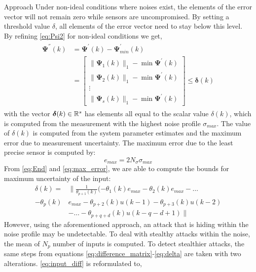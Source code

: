 \begin{section}{Approach}
Under non-ideal conditions where noises exist, the elements of the error vector will not remain zero while sensors are uncompromised. By setting a threshold value $\delta$, all elements of the error vector need to stay below this level. By refining \eqref{eq:Psi2} for non-ideal conditions we get,
    \begin{align}
    \begin{split}
    \label{eq:Psi2_nonideal}
	\bm{\Psi^{''}}(k)&=\bm{\Psi^{'}}(k)-\bm{\Psi}^{'}_{min}(k) \\
	& =\begin{bmatrix} \lVert{\bm{\Psi}_1(k)}\rVert_1 - \min \bm{\Psi}^{'}(k)\\ \lVert{\bm{\Psi}_2(k)}\rVert_1 - \min \bm{\Psi}^{'}(k) \\ \vdots \\ \lVert{\bm{\Psi}_s(k)}\rVert_1 - \min \bm{\Psi}^{'}(k) \end{bmatrix} \leq \bm{\delta}(k)
	\end{split}
	\end{align}
with the vector $\bm{\delta}(k) \in \mathbb{R}^s$ has elements all equal to the scalar value $\delta(k)$, which is computed from the measurement with the highest noise profile $\sigma_{max}$. The value of $\delta(k)$ is computed from the system parameter estimates and the maximum error due to measurement uncertainty. The maximum error due to the least precise sensor is computed by:
	\begin{equation}
	    \label{eq:max_error}
	    e_{max} = 2N_{\sigma}\sigma_{max}
	\end{equation}
From \eqref{eq:End} and \eqref{eq:max_error}, we are able to compute the bounds for maximum uncertainty of the input:
\begin{align}
	\label{eq:delta}
	\delta(k)=& \lVert{ \frac{1}{\theta_{p+1}(k)}(-\theta_1(k)e_{max}-\theta_2(k)e_{max} }-\dots \nonumber \\
    -\theta_p(k)&e_{max}-\theta_{p+2}(k)u(k-1)-\theta_{p+3}(k)u(k-2)  \\
	&- \dots - \theta_{p+q+d}(k)u(k-q-d+1) \rVert  \nonumber
	\end{align}
However, using the aforementioned approach, an attack that is hiding within the noise profile may be undetectable. To deal with stealthy attacks within the noise, the mean of $N_p$ number of inputs is computed. To detect stealthier attacks, the same steps from equations \eqref{eq:difference_matrix}-\eqref{eq:delta} are taken with two alterations. \eqref{eq:input_diff} is reformulated to,
    \begin{equation}

\end{equation}
\end{section}

